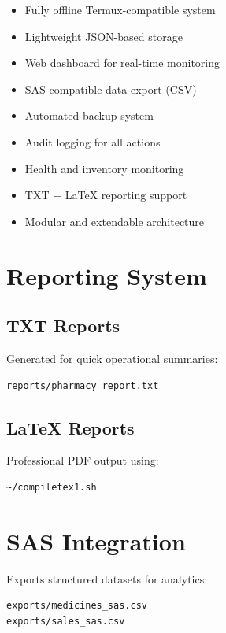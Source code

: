 \documentclass[12pt,a4paper]{article}
\begin{document}
\begin{tcolorbox}[
colback=lightblue,
colframe=mainblue,
title=Key Features]

\begin{itemize}
\item Fully offline Termux-compatible system
\item Lightweight JSON-based storage
\item Web dashboard for real-time monitoring
\item SAS-compatible data export (CSV)
\item Automated backup system
\item Audit logging for all actions
\item Health and inventory monitoring
\item TXT + LaTeX reporting support
\item Modular and extendable architecture
\end{itemize}

\end{tcolorbox}

\section{Reporting System}

\subsection{TXT Reports}
Generated for quick operational summaries:
\begin{verbatim}
reports/pharmacy_report.txt
\end{verbatim}

\subsection{LaTeX Reports}
Professional PDF output using:
\begin{verbatim}
~/compiletex1.sh
\end{verbatim}

\section{SAS Integration}

Exports structured datasets for analytics:

\begin{verbatim}
exports/medicines_sas.csv
exports/sales_sas.csv
\end{verbatim}
\end{document}

